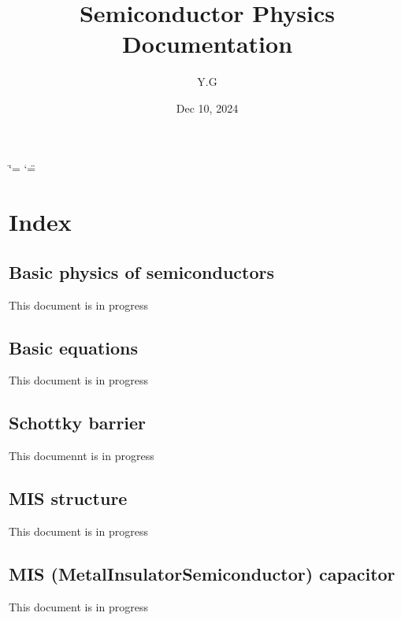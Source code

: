 \documentclass[a4paper,10pt,english]{sphinxmanual}
\title{Semiconductor Physics Documentation}
\date{Dec 10, 2024}
\author{Y.G}
\begin{document}
\ifdefined\shorthandoff
  \ifnum\catcode`\=\string=\active\shorthandoff{=}\fi
  \ifnum\catcode`\"=\active{}\fi
\fi

\pagestyle{empty}
\sphinxmaketitle
\pagestyle{plain}
\sphinxtableofcontents
\pagestyle{normal}
\label{\detokenize{index::doc}}



\chapter{Index}
\label{\detokenize{index:index}}
\sphinxstepscope


\section{Basic physics of semiconductors}
\label{\detokenize{Basic_physics_of_semiconductors:basic-physics-of-semiconductors}}\label{\detokenize{Basic_physics_of_semiconductors::doc}}
\sphinxAtStartPar
This document is in progress

\sphinxstepscope


\section{Basic equations}
\label{\detokenize{Basic_equation:basic-equations}}\label{\detokenize{Basic_equation::doc}}
\sphinxAtStartPar
This document is in progress

\sphinxstepscope


\section{Schottky barrier}
\label{\detokenize{Schottky_barrier:schottky-barrier}}\label{\detokenize{Schottky_barrier::doc}}
\sphinxAtStartPar
This documennt is in progress

\sphinxstepscope


\section{MIS structure}
\label{\detokenize{MIS_structure:mis-structure}}\label{\detokenize{MIS_structure::doc}}
\sphinxAtStartPar
This document is in progress

\sphinxstepscope


\section{MIS (Metal\sphinxhyphen{}Insulator\sphinxhyphen{}Semiconductor) capacitor}
\label{\detokenize{MIS_capacitor:mis-metal-insulator-semiconductor-capacitor}}\label{\detokenize{MIS_capacitor::doc}}
\sphinxAtStartPar
This document is in progress
\end{document}
